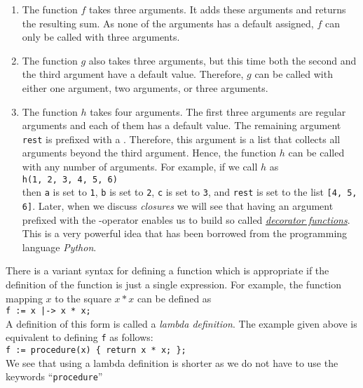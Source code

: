 \begin{enumerate}
\item The function $f$ takes three arguments.  It adds these arguments and returns the resulting
      sum.  As none of the arguments has a default assigned, $f$ can only be called with three arguments.
\item The function $g$ also takes three arguments, but this time both the second and the third
      argument have a default value.  Therefore, $g$ can be called with either one argument, two
      arguments, or three arguments.
\item The function $h$ takes four arguments.  The first three arguments are regular arguments and
      each of them has a default value.  The remaining argument \texttt{rest} is prefixed with a 
      \squoted{*}.  Therefore, this argument is a list that collects all arguments beyond the third
      argument.  Hence, the function $h$ can be called with any number of arguments.  For example,
      if we call $h$ as
      \\[0.2cm]
      \hspace*{1.3cm}
      \texttt{h(1, 2, 3, 4, 5, 6)}
      \\[0.2cm]
      then \texttt{a} is set to \texttt{1}, \texttt{b} is set to \texttt{2}, \texttt{c} is set to
      \texttt{3}, and \texttt{rest} is set to the list \texttt{[4, 5, 6]}.  Later, when we discuss
      \emph{closures} we will see that having an argument prefixed with the \squoted{*}-operator
      enables us to build so called 
      \href{http://en.wikipedia.org/wiki/Python_syntax_and_semantics#Decorators}{\emph{decorator functions}}.
      This is a very powerful idea that has been borrowed from the programming language \textsl{Python}.
\end{enumerate}
There is a variant syntax for defining a function which is appropriate if the definition of the
function is just a single expression.  For example, the function mapping $x$ to the square
$x*x$ can be defined as
\\[0.2cm]
\hspace*{1.3cm}
\texttt{f := x |-> x * x;}
\\[0.2cm]
A definition of this form is called a \emph{lambda definition}.  The example given above is
equivalent to defining \texttt{f} as follows:
\\[0.2cm]
\hspace*{1.3cm}
\texttt{f := procedure(x) \{ return x * x; \};}
\\[0.2cm]
We see that using a lambda definition is shorter as we do not have to use the keywords ``\texttt{procedure}''
